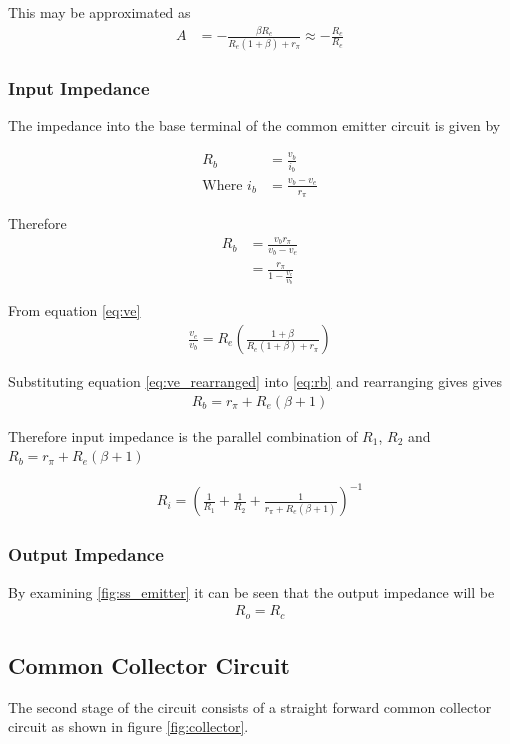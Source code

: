 \documentclass[a4paper,11pt]{article}
\begin{document}
This may be approximated as 
\begin{align}
A &= - \frac{\beta R_c}{R_e (1 + \beta) + r_\pi} \approx -\frac{R_c}{R_e}
\end{align}

\subsubsection{Input Impedance}
The impedance into the base terminal of the common emitter circuit is given by 

\begin{align*}
R_b &= \frac{v_b}{i_b} \\
\textrm{Where } i_b &= \frac{v_b - v_e}{r_\pi}
\end{align*}

Therefore
\begin{align}
R_b &= \frac{v_b r_\pi}{v_b - v_e} \nonumber \\
	&= \frac{r_\pi}{1 - \frac{v_e}{v_b}} \label{eq:rb}
\end{align}

From equation \ref{eq:ve}
\begin{align}
	\frac{v_e}{v_b} = R_e (\frac{1 + \beta}{R_e (1 + \beta) + r_\pi}) \label{eq:ve_rearranged}
\end{align}

Substituting equation \ref{eq:ve_rearranged} into \ref{eq:rb} and rearranging gives gives
\begin{align*}
	R_b = r_\pi + R_e (\beta + 1)
\end{align*}

Therefore input impedance is the parallel combination of $R_1$, $R_2$ and $R_b = r_\pi + R_e (\beta + 1)$

\begin{align}
	R_i = ( \frac{1}{R_1} + \frac{1}{R_2} + \frac{1}{r_\pi + R_e (\beta + 1)} )^{-1} \label{eq:input_inpedance_emitter}
\end{align}

\subsubsection{Output Impedance}
By examining \ref{fig:ss_emitter} it can be seen that the output impedance will be
\begin{align}
R_o = R_c \label{eq:output_inpedance_emitter}
\end{align}


\subsection{Common Collector Circuit}
The second stage of the circuit consists of a straight forward common collector circuit as shown in figure \ref{fig:collector}.
\end{document}
